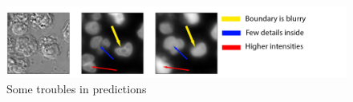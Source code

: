 \begin{figure}[H]
	\begin{center}
		\includegraphics[width=0.8\linewidth]{bilder/nuclei/problems.png}
		\caption{Some troubles in predictions}\label{fig:nuclei-troubles}
	\end{center}
\end{figure}